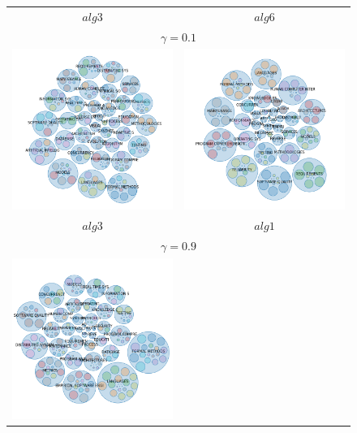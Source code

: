 \begin{figure}[H]
	\centering
	\begin{tabular}{cc}
		$alg3$ & $alg6$\\
		\multicolumn{2}{c}{$\gamma=0.1$}\\ 
			\includegraphics[width=0.5\linewidth]{img/gamma-01-burbujas-alg-3.png}&
			\includegraphics[width=0.5\linewidth]{img/gamma-01-burbujas-alg-6.png} 		\vspace{1cm}\\
			$alg3$ & $alg1$\\
		\multicolumn{2}{c}{$\gamma=0.9$}\\
			\includegraphics[width=0.5\linewidth]{img/gamma-09-burbujas-alg-3.png}&

\end{tabular}
\end{figure}
